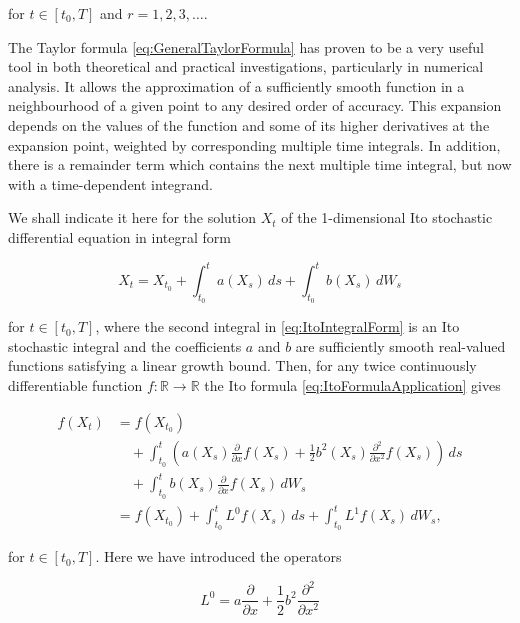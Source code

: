 \noindent for $t \in [t_0, T]$ and $r = 1, 2, 3, \dots$.

The Taylor formula \eqref{eq:GeneralTaylorFormula} has proven to be a very useful tool in both theoretical and practical investigations, particularly in numerical analysis. It allows the approximation of a sufficiently smooth function in a neighbourhood of a given point to any desired order of accuracy. This expansion depends on the values of the function and some of its higher derivatives at the expansion point, weighted by corresponding multiple time integrals. In addition, there is a remainder term which contains the next multiple time integral, but now with a time-dependent integrand.

We shall indicate it here for the solution $X_t$ of the 1-dimensional Ito stochastic differential equation in integral form

\begin{equation} \label{eq:ItoIntegralForm}
    X_t = X_{t_0} + \int_{t_0}^t a(X_s) \, ds + \int_{t_0}^t b(X_s) \, dW_s
\end{equation}

\noindent for $t \in [t_0, T]$, where the second integral in \eqref{eq:ItoIntegralForm} is an Ito stochastic integral and the coefficients $a$ and $b$ are sufficiently smooth real-valued functions satisfying a linear growth bound. Then, for any twice continuously differentiable function $f : \mathbb{R} \to \mathbb{R}$ the Ito formula \cref{eq:ItoFormulaApplication} gives

\begin{equation} \label{eq:ItoFormulaApplication}
\begin{split}
    f(X_t) &= f(X_{t_0}) \\
    &\quad + \int_{t_0}^t \left( a(X_s)\frac{\partial}{\partial x}f(X_s) + \frac{1}{2}b^2(X_s)\frac{\partial^2}{\partial x^2}f(X_s) \right) \, ds \\
    &\quad + \int_{t_0}^t b(X_s)\frac{\partial}{\partial x}f(X_s) \, dW_s \\
    &= f(X_{t_0}) + \int_{t_0}^t L^0 f(X_s) \, ds + \int_{t_0}^t L^1 f(X_s) \, dW_s,
\end{split}
\end{equation}

\noindent for $t \in [t_0, T]$. Here we have introduced the operators

\begin{equation} \label{eq:OperatorL0}
    L^0 = a \frac{\partial}{\partial x} + \frac{1}{2}b^2 \frac{\partial^2}{\partial x^2}
\end{equation}

